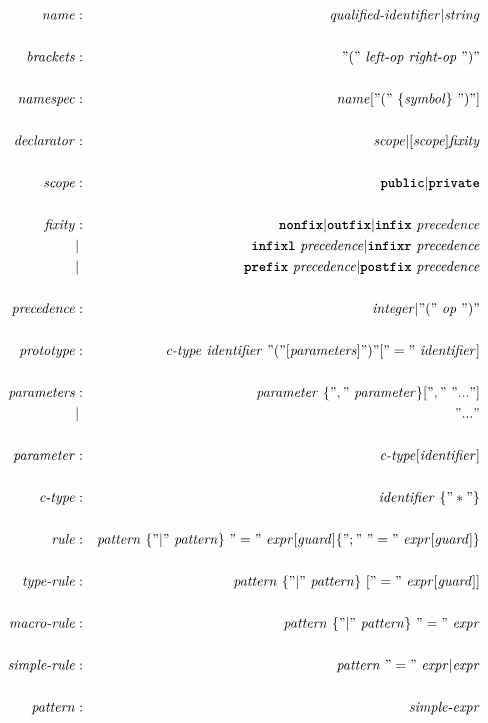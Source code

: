 \documentclass[a4paper,12pt]{article}
\newcommand{\kw}[1]{\texttt{\textbf{#1}}}
\newcommand{\nt}[1]{\textrm{\textit{#1\/}}}
\begin{document}
\begin{bnf}
\begin{eqnarray*}
\nt{name}	&:& \nt{qualified-identifier} | \nt{string} \\
\\
\nt{brackets}	&:& "("\ \nt{left-op}\ \nt{right-op}\ ")" \\
\\
\nt{namespec}	&:& \nt{name} [ "("\ \{ \nt{symbol} \}\ ")" ]\\
\\
\nt{declarator}	&:& \nt{scope} | [ \nt{scope} ] \nt{fixity} \\
\\
\nt{scope}	&:& \kw{public} | \kw{private} \\
\\
\nt{fixity}	&:& \kw{nonfix} | \kw{outfix} | \kw{infix}\ \nt{precedence} \\
		&|& \kw{infixl}\ \nt{precedence} | \kw{infixr}\ \nt{precedence} \\
		&|& \kw{prefix}\ \nt{precedence} | \kw{postfix}\ \nt{precedence} \\
\\
\nt{precedence}	&:& \nt{integer} | "("\ \nt{op}\ ")" \\
\\
\nt{prototype}	&:& \nt{c-type}\ \nt{identifier}\ "(" [ \nt{parameters} ] ")" [ "="\ \nt{identifier} ] \\
\\
\nt{parameters}	&:& \nt{parameter}\ \{ ","\ \nt{parameter} \} [ ","\ "..." ] \\
		&|& "..." \\
\\
\nt{parameter}	&:& \nt{c-type} [ \nt{identifier} ] \\
\\
\nt{c-type}	&:& \nt{identifier}\ \{ "*" \} \\
\\
\nt{rule}	&:& \nt{pattern}\ \{ "|"\ \nt{pattern} \}\ "="\ \nt{expr} [ \nt{guard} ] \{ ";"\ "="\ \nt{expr} [ \nt{guard} ] \} \\
\\
\nt{type-rule}	&:& \nt{pattern}\ \{ "|"\ \nt{pattern} \}\ [ "="\ \nt{expr} [ \nt{guard} ] ] \\
\\
\nt{macro-rule}	&:& \nt{pattern}\ \{ "|"\ \nt{pattern} \}\ "="\ \nt{expr} \\
\\
\nt{simple-rule}&:& \nt{pattern}\ "="\ \nt{expr} | \nt{expr} \\
\\
\nt{pattern}	&:& \nt{simple-expr} \\

\end{eqnarray*}
\end{bnf}
\end{document}
